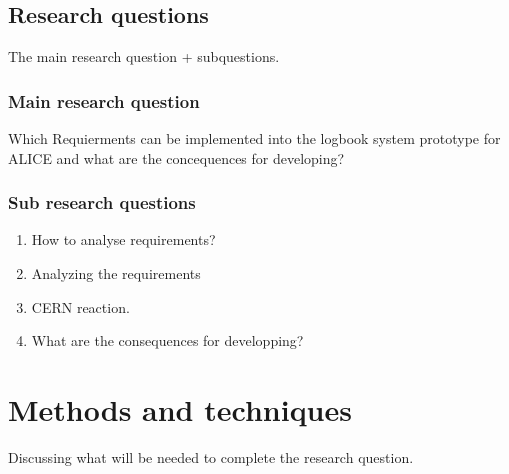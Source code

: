 \documentclass[paper=a4, fontsize=11pt,twoside]{scrartcl}	%
\begin{document}
\subsection{Research questions}
The main research question + subquestions.
\subsubsection{Main research question}
Which Requierments can be implemented into the logbook system prototype for ALICE and what are the concequences for developing?
% 
%
%
% 
% 
% 


\subsubsection{Sub research questions}
\begin{enumerate}
\item How to analyse requirements?
\item Analyzing the requirements
\item CERN reaction.
\item What are the consequences for developping?

\end{enumerate}



\newpage
\section{Methods and techniques}
Discussing what will be needed to complete the research question.
\end{document}
